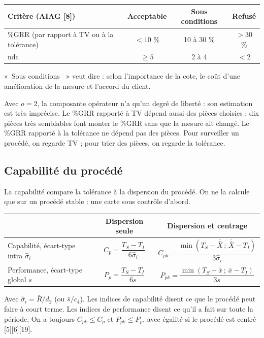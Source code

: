 \documentclass[11pt,a4paper]{article}
\providecommand{\og}{«~}\providecommand{\fg}{~»}
\newcommand{\xbb}{\bar{\bar{X}}}
\newcommand{\Rb}{\bar{R}}
\begin{document}
\begin{center}\small
\begin{tabular}{@{}lccc@{}}\toprule
\textbf{Critère (AIAG [8])} & \textbf{Acceptable} & \textbf{Sous conditions} & \textbf{Refusé}\\\midrule
\%GRR (par rapport à TV ou à la tolérance) & $<10$ \% & 10 à 30 \% & $>30$ \%\\
ndc & $\ge5$ & 2 à 4 & $<2$\\\bottomrule
\end{tabular}
\end{center}
\og Sous conditions \fg{} veut dire : selon l'importance de la cote, le coût d'une amélioration de la mesure et l'accord du client.

\begin{attention}
Avec $o=2$, la composante opérateur n'a qu'un degré de liberté : son estimation est très imprécise. Le \%GRR rapporté à TV dépend aussi des pièces choisies : dix pièces très semblables font monter le \%GRR sans que la mesure ait changé. Le \%GRR rapporté à la tolérance ne dépend pas des pièces. Pour surveiller un procédé, on regarde TV ; pour trier des pièces, on regarde la tolérance.
\end{attention}

\subsection{Capabilité du procédé}\label{sec:cap}
La capabilité compare la tolérance à la dispersion du procédé. On ne la calcule que sur un procédé stable : une carte sous contrôle d'abord.
\begin{center}\small
\renewcommand{\arraystretch}{1.9}
\begin{tabular}{@{}lcc@{}}\toprule
 & \textbf{Dispersion seule} & \textbf{Dispersion et centrage}\\\midrule
Capabilité, écart-type intra $\hat\sigma_i$ & $C_p=\dfrac{T_S-T_I}{6\hat\sigma_i}$ & $C_{pk}=\dfrac{\min(T_S-\xbb\,;\,\xbb-T_I)}{3\hat\sigma_i}$\\
Performance, écart-type global $s$ & $P_p=\dfrac{T_S-T_I}{6s}$ & $P_{pk}=\dfrac{\min(T_S-\bar x\,;\,\bar x-T_I)}{3s}$\\\bottomrule
\end{tabular}
\end{center}
Avec $\hat\sigma_i=\Rb/d_2$ (ou $\bar s/c_4$). Les indices de capabilité disent ce que le procédé peut faire à court terme. Les indices de performance disent ce qu'il a fait sur toute la période. On a toujours $C_{pk}\le C_p$ et $P_{pk}\le P_p$, avec égalité si le procédé est centré [5][6][19].
\end{document}
